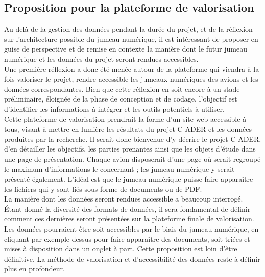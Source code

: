 
        \subsection{Proposition pour la plateforme de valorisation}

Au delà de la gestion des données pendant la durée du projet, et de la réflexion sur l'architecture possible du jumeau numérique, il est intéressant de proposer en guise de perspective et de remise en contexte la manière dont le futur jumeau numérique et les données du projet seront rendues accessibles.\\

Une première réflexion a donc été menée autour de la plateforme qui viendra à la fois valoriser le projet, rendre accessible les jumeaux numériques des avions et les données correspondantes. Bien que cette réflexion en soit encore à un stade préliminaire, éloignée de la phase de conception et de codage, l’objectif est d’identifier les informations à intégrer et les outils potentiels à utiliser.\\

Cette plateforme de valorisation prendrait la forme d’un site web accessible à tous, visant à mettre en lumière les résultats du projet C-ADER et les données produites par la recherche. Il serait donc bienvenue d’y décrire le projet C-ADER, d'en détailler les objectifs, les parties prenantes ainsi que les objets d’étude dans une page de présentation. Chaque avion disposerait d’une page où serait regroupé le maximum d’informations le concernant ; les jumeau numérique y serait présenté également. L’idéal est que le jumeau numérique puisse faire apparaître les fichiers qui y sont liés sous forme de documents ou de PDF.\\
 
La manière dont les données seront rendues accessible a beaucoup interrogé. Étant donné la diversité des formats de données, il sera fondamental de définir comment ces dernières seront présentées sur la plateforme finale de valorisation. Les données pourraient être soit accessibles par le biais du jumeau numérique, en cliquant par exemple dessus pour faire apparaître des documents, soit triées et mises à disposition dans un onglet à part. Cette proposition est loin d’être définitive. La méthode de valorisation et d’accessibilité des données reste à définir plus en profondeur.\\


